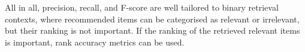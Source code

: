 \begin{description}

	
    


All in all, precision, recall, and F-score are well tailored to binary retrieval contexts, where recommended items can be categorised as relevant or irrelevant, but their ranking is not important. 
If the ranking of the retrieved relevant items is important, rank accuracy metrics can be used.
\end{description}

